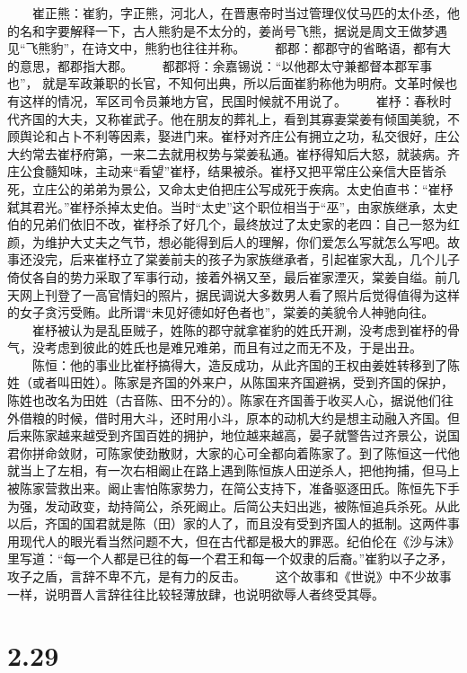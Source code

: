 \documentclass[]{book}
\begin{document}
　　崔正熊：崔豹，字正熊，河北人，在晋惠帝时当过管理仪仗马匹的太仆丞，他的名和字要解释一下，古人熊豹是不太分的，姜尚号飞熊，据说是周文王做梦遇见``飞熊豹''，在诗文中，熊豹也往往并称。
　　都郡：都郡守的省略语，都有大的意思，都郡指大郡。
　　都郡将：余嘉锡说：``以他郡太守兼都督本郡军事也''，
就是军政兼职的长官，不知何出典，所以后面崔豹称他为明府。文革时候也有这样的情况，军区司令员兼地方官，民国时候就不用说了。
　　崔杼：春秋时代齐国的大夫，又称崔武子。他在朋友的葬礼上，看到其寡妻棠姜有倾国美貌，不顾舆论和占卜不利等因素，娶进门来。崔杼对齐庄公有拥立之功，私交很好，庄公大约常去崔杼府第，一来二去就用权势与棠姜私通。崔杼得知后大怒，就装病。齐庄公食髓知味，主动来``看望''崔杼，结果被杀。崔杼又把平常庄公亲信大臣皆杀死，立庄公的弟弟为景公，又命太史伯把庄公写成死于疾病。太史伯直书：``崔杼弑其君光。''崔杼杀掉太史伯。当时``太史''这个职位相当于``巫''，由家族继承，太史伯的兄弟们依旧不改，崔杼杀了好几个，最终放过了太史家的老四：自己一怒为红颜，为维护大丈夫之气节，想必能得到后人的理解，你们爱怎么写就怎么写吧。故事还没完，后来崔杼立了棠姜前夫的孩子为家族继承者，引起崔家大乱，几个儿子倚仗各自的势力采取了军事行动，接着外祸又至，最后崔家湮灭，棠姜自缢。前几天网上刊登了一高官情妇的照片，据民调说大多数男人看了照片后觉得值得为这样的女子贪污受贿。此所谓``未见好德如好色者也''，棠姜的美貌令人神驰向往。
　　崔杼被认为是乱臣贼子，姓陈的郡守就拿崔豹的姓氏开涮，没考虑到崔杼的骨气，没考虑到彼此的姓氏也是难兄难弟，而且有过之而无不及，于是出丑。
　　陈恒：他的事业比崔杼搞得大，造反成功，从此齐国的王权由姜姓转移到了陈姓（或者叫田姓）。陈家是齐国的外来户，从陈国来齐国避祸，受到齐国的保护，陈姓也改名为田姓（古音陈、田不分的）。陈家在齐国善于收买人心，据说他们往外借粮的时候，借时用大斗，还时用小斗，原本的动机大约是想主动融入齐国。但后来陈家越来越受到齐国百姓的拥护，地位越来越高，晏子就警告过齐景公，说国君你拼命敛财，可陈家使劲散财，大家的心可全都向着陈家了。到了陈恒这一代他就当上了左相，有一次右相阚止在路上遇到陈恒族人田逆杀人，把他拘捕，但马上被陈家营救出来。阚止害怕陈家势力，在简公支持下，准备驱逐田氏。陈恒先下手为强，发动政变，劫持简公，杀死阚止。后简公夫妇出逃，被陈恒追兵杀死。从此以后，齐国的国君就是陈（田）家的人了，而且没有受到齐国人的抵制。这两件事用现代人的眼光看当然问题不大，但在古代都是极大的罪恶。纪伯伦在《沙与沫》里写道：``每一个人都是已往的每一个君王和每一个奴隶的后裔。''崔豹以子之矛，攻子之盾，言辞不卑不亢，是有力的反击。
　　这个故事和《世说》中不少故事一样，说明晋人言辞往往比较轻薄放肆，也说明欲辱人者终受其辱。

\section{2.29}\label{section-75}
\end{document}
